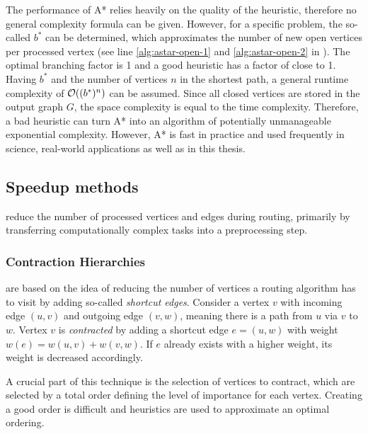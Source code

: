 			The performance of A* relies heavily on the quality of the heuristic, therefore no general complexity formula can be given\cite{russell-norvig-ai-modern-approach}.
			However, for a specific problem, the so-called  $b^*$ can be determined, which approximates the number of new open vertices per processed vertex (see line \ref{alg:astar-open-1} and \ref{alg:astar-open-2} in ).
			The optimal branching factor is 1 and a good heuristic has a factor of close to 1.
			Having $b^*$ and the number of vertices $n$ in the shortest path, a general runtime complexity of $\mathcal{O}((b^*)^n)$ can be assumed.
			Since all closed vertices are stored in the output graph $G$, the space complexity is equal to the time complexity.
			Therefore, a bad heuristic can turn A* into an algorithm of potentially unmanageable exponential complexity.
			However, A* is fast in practice and used frequently in science, real-world applications as well as in this thesis.
		
	\subsection{Speedup methods}
	\label{subsec:speedup-methods}
	
		 reduce the number of processed vertices and edges during routing, primarily by transferring computationally complex tasks into a preprocessing step.
		
		\subsubsection{Contraction Hierarchies}
		\label{subsubsec:ch}
		
			 are based on the idea of reducing the number of vertices a routing algorithm has to visit by adding so-called \emph{shortcut edges}\cite{geisberger-contraction-hierarchies}.
			Consider a vertex $v$ with incoming edge $(u, v)$ and outgoing edge $(v, w)$, meaning there is a path from $u$ via $v$ to $w$.
			Vertex $v$ is \emph{contracted} by adding a shortcut edge $e = (u, w)$ with weight $w(e) = w(u, v) + w(v, w)$.
			If $e$ already exists with a higher weight, its weight is decreased accordingly.
			
			A crucial part of this technique is the selection of vertices to contract\cite[14]{geisberger-contraction-hierarchies}, which are selected by a total order defining the level of importance for each vertex.
			Creating a good order is difficult and heuristics are used to approximate an optimal ordering.
			
